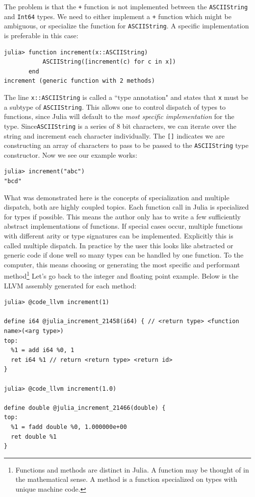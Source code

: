 The problem is that the \texttt{+} function is not implemented between the
\texttt{ASCIIString} and \texttt{Int64} types.
We need to either implement a \texttt{+} function
which might be ambiguous, or specialize the function for \texttt{ASCIIString}.
A specific implementation is preferable in this case:
\begin{lstlisting}
julia> function increment(x::ASCIIString)
           ASCIIString([increment(c) for c in x])
       end
increment (generic function with 2 methods)
\end{lstlisting}
The line \texttt{x::ASCIIString} is called a ``type annotation" and
states that \texttt{x} must be a subtype
of \texttt{ASCIIString}. This allows one to control dispatch of types to
functions,
since Julia will default to the \emph{most specific implementation}
for the type.
Since\texttt{ASCIIString} is a series of 8 bit characters, we can iterate over the
string and increment each character individually. The \texttt{[]} indicates we are
constructing an array of characters to pass to be passed to the \texttt{ASCIIString}
type constructor. Now we see our example works:
\begin{lstlisting}
julia> increment("abc")
"bcd"
\end{lstlisting}

What was demonstrated here is the concepts of specialization and multiple
dispatch, both are highly coupled topics.
Each function call in Julia is specialized for types if possible.
This means the author only has to write a few sufficiently abstract
implementations of functions. If special cases occur, multiple functions
with different arity or type signatures can be implemented. Explicitly
this is called multiple dispatch. In practice by the user this looks like
abstracted or generic code if done well so many types can be handled
by one function.
To the computer, this means choosing or generating the most specific and
performant method\footnote{Functions and methods are distinct in Julia. A
function may be thought of in the mathematical sense. A method is a
function specialized on types with unique machine code.}
Let's go back to the integer and floating point
example. Below is the LLVM assembly generated for each method:
\begin{lstlisting}
julia> @code_llvm increment(1)

define i64 @julia_increment_21458(i64) { // <return type> <function name>(<arg type>)
top:
  %1 = add i64 %0, 1
  ret i64 %1 // return <return type> <return id>
}

julia> @code_llvm increment(1.0)

define double @julia_increment_21466(double) {
top:
  %1 = fadd double %0, 1.000000e+00
  ret double %1
}
\end{lstlisting}

